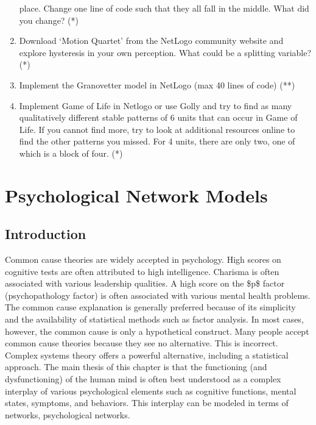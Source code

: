\documentclass[
  a4paper,
  DIV=11,
  numbers=noendperiod,
  oneside]{scrreprt}
\begin{document}
\begin{enumerate}
  place. Change one line of code such that they all fall in the middle.
  What did you change? (*)
\item
  Download `Motion Quartet' from the NetLogo community website and
  explore hysteresis in your own perception. What could be a splitting
  variable? (*)
\item
  Implement the Granovetter model in NetLogo (max 40 lines of code) (**)
\item
  Implement Game of Life in Netlogo or use Golly and try to find as many
  qualitatively different stable patterns of 6 units that can occur in
  Game of Life. If you cannot find more, try to look at additional
  resources online to find the other patterns you missed. For 4 units,
  there are only two, one of which is a block of four. (*)
\end{enumerate}


\hypertarget{sec-ch6}{%
\chapter{Psychological Network Models}\label{sec-ch6}}

\hypertarget{sec-Introduction}{%
\section{Introduction}\label{sec-Introduction}}

Common cause theories are widely accepted in psychology. High scores on
cognitive tests are often attributed to high intelligence. Charisma is
often associated with various leadership qualities. A high score on the
\$p\$ factor (psychopathology factor) is often associated with various
mental health problems. The common cause explanation is generally
preferred because of its simplicity and the availability of statistical
methods such as factor analysis. In most cases, however, the common
cause is only a hypothetical construct. Many people accept common cause
theories because they see no alternative. This is incorrect. Complex
systems theory offers a powerful alternative, including a statistical
approach. The main thesis of this chapter is that the functioning (and
dysfunctioning) of the human mind is often best understood as a complex
interplay of various psychological elements such as cognitive functions,
mental states, symptoms, and behaviors. This interplay can be modeled in
terms of networks, psychological networks.
\end{document}
